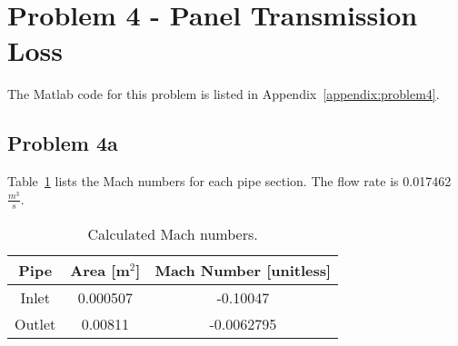{%
%












\newpage
\section*{Problem 4 - Panel Transmission Loss}

The Matlab code for this problem is listed in Appendix~\ref{appendix:problem4}.

\subsection*{Problem 4a}

Table~\ref{table:machNumbers} lists the Mach numbers for each pipe section.  The flow rate is 0.017462 $\frac{m^3}{s}$.

\setlength{\abovecaptionskip}{0pt}
\vspace{0.1cm}
{\renewcommand{\arraystretch}{1.5}
\begin{table}[h!]
    \begin{center}
        \small
        \begin{tabular}{ | c | c | c | }
            \hline
            \textbf{Pipe}  &  \textbf{Area [}{$\mathbf m^2$}\textbf{]}  &  \textbf{Mach Number [unitless]}  \\
            \hline
                Inlet  &  0.000507  &  -0.10047  \\
                \hline
                \rowcolor{Gray}
                Outlet  &  0.00811  &  -0.0062795  \\
            \hline
        \end{tabular}
    \end{center}
    \caption{Calculated Mach numbers.}
    \label{table:machNumbers}
\end{table}



}}

